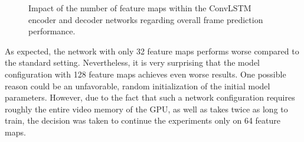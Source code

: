 \begin{figure}[htb]
\begin{subfigure}{0.5\textwidth}
{
  }
  \caption{}
  \label{fig:plot-mm-filter-bce}
\end{subfigure}%
\begin{subfigure}{0.5\textwidth}
  \centering
  \modelA
  \modelB
  \modelC
  \hspace*{-0.6cm}
  {
  }
  \caption{}
  \label{fig:plot-mm-filter-psnr}
\end{subfigure}
\caption[Influences of ConvLSTM Feature Maps]{Impact of the number of feature maps within the ConvLSTM encoder and decoder networks regarding overall frame prediction performance.} \label{fig:plot-mm-filter}
\end{figure}

As expected, the network with only 32 feature maps performs worse compared to the standard setting. Nevertheless, it is very surprising that the model configuration with 128 feature maps achieves even worse results. One possible reason could be an unfavorable, random initialization of the initial model parameters. However, due to the fact that such a network configuration requires roughly the entire video memory of the GPU, as well as takes twice as long to train, the decision was taken to continue the experiments only on 64 feature maps.


